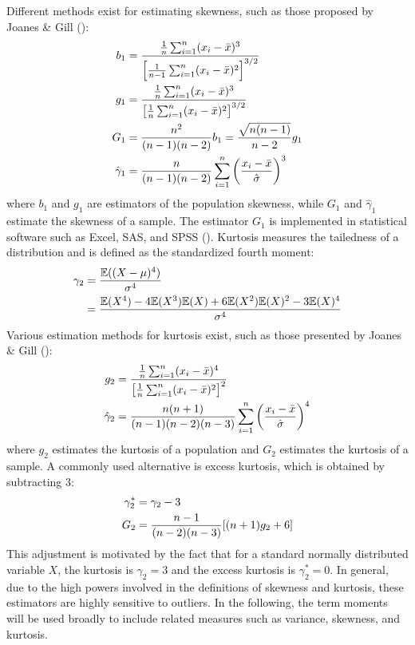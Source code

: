 Different methods exist for estimating skewness, such as those proposed by Joanes \& Gill (\citeyear{joanesComparingMeasuresSample1998}):
\begin{align}
    b_1 &= \frac{\frac{1}{n}\sum_{i=1}^{n}(x_i-\bar{x})^3}{\left[\frac{1}{n-1}\sum_{i=1}^{n}(x_i-\bar{x})^2\right]^{3/2}} \notag \\
    g_1 &= \frac{\frac{1}{n}\sum_{i=1}^{n}(x_i-\bar{x})^3}{\left[\frac{1}{n}\sum_{i=1}^{n}(x_i-\bar{x})^2\right]^{3/2}} \notag \\
    G_1 &= \frac{n^2}{(n-1)(n-2)}b_1 = \frac{\sqrt{n(n-1)}}{n-2}g_1 \notag \\
    \hat{\gamma}_1 &= \frac{n}{(n-1)(n-2)}\sum_{i=1}^n \left(\frac{x_i-\bar{x}}{\hat{\sigma}}\right)^3 \notag
\end{align}
where $b_1$ and $g_1$ are estimators of the population skewness, while $G_1$ and $\hat{\gamma}_1$ estimate the skewness of a sample. The estimator $G_1$ is implemented in statistical software such as Excel, SAS, and SPSS (\cite{doaneMeasuringSkewnessForgotten2011}). Kurtosis measures the tailedness of a distribution and is defined as the standardized fourth moment:
\begin{align}
    \label{eq:definition_kurtosis}
    \gamma_2 &= \frac{\mathbb{E}((X-\mu)^4)}{\sigma^4} \\
    &= \frac{\mathbb{E}(X^4) - 4\mathbb{E}(X^3)\mathbb{E}(X) + 6\mathbb{E}(X^2)\mathbb{E}(X)^2 - 3\mathbb{E}(X)^4}{\sigma^4} \notag
\end{align}
Various estimation methods for kurtosis exist, such as those presented by Joanes \& Gill (\citeyear{joanesComparingMeasuresSample1998}):
\begin{align}
    g_2 &= \frac{\frac{1}{n}\sum_{i=1}^{n}(x_i-\bar{x})^4}{\left[\frac{1}{n}\sum_{i=1}^{n}(x_i-\bar{x})^2\right]^2} \notag \\
    \hat{\gamma}_2 &= \frac{n(n+1)}{(n-1)(n-2)(n-3)}\sum_{i=1}^n \left(\frac{x_i-\bar{x}}{\hat{\sigma}}\right)^4 \notag
\end{align}
where $g_2$ estimates the kurtosis of a population and $G_2$ estimates the kurtosis of a sample. A commonly used alternative is excess kurtosis, which is obtained by subtracting 3:
\begin{align}
    \gamma_2^* &= \gamma_2 - 3\notag \\
    G_2 &= \frac{n-1}{(n-2)(n-3)}[(n+1)g_2 + 6] \notag
\end{align}
This adjustment is motivated by the fact that for a standard normally distributed variable $X$, the kurtosis is $\gamma_2 = 3$ and the excess kurtosis is $\gamma_2^* = 0$. In general, due to the high powers involved in the definitions of skewness and kurtosis, these estimators are highly sensitive to outliers. In the following, the term moments will be used broadly to include related measures such as variance, skewness, and kurtosis.

